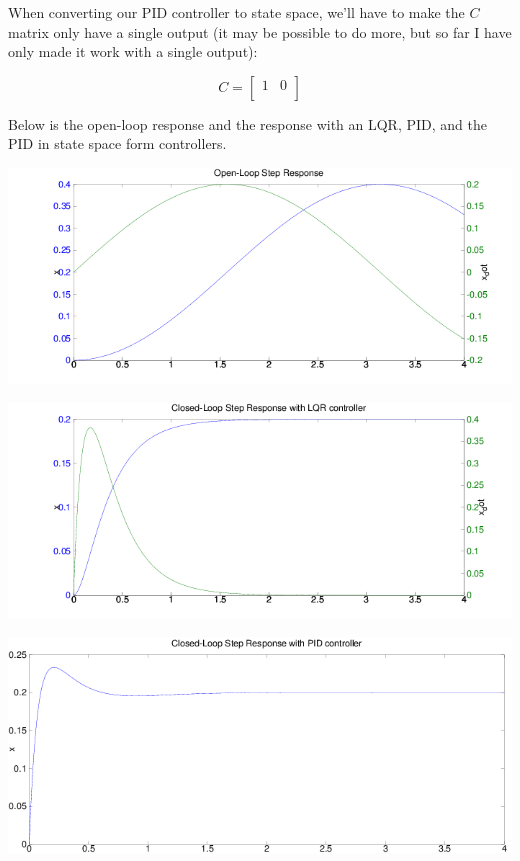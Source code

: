 \documentclass[10pt,letterpaper]{article}
\begin{document}
When converting our PID controller to state space, we'll have to make the $C$ matrix only have a single output (it may be possible to do more, but so far I have only made it work with a single output):

\[
C = \begin{bmatrix}
	1 & 0 \\
\end{bmatrix}
\]

Below is the open-loop response and the response with an LQR, PID, and the PID in state space form controllers.

\begin{center}
\includegraphics[scale=0.6]{image-ol}
\end{center}

\begin{center}
\includegraphics[scale=0.6]{image-lqr}
\end{center}

\begin{center}
\includegraphics[scale=0.6]{image-pid}
\end{center}
\end{document}
